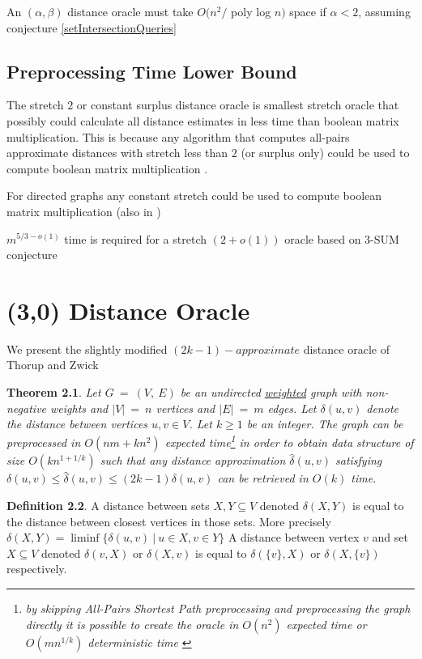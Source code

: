 \documentclass[shortabstract, lic, english]{iithesis}
\theoremstyle{definition} \newtheorem{definition}{Definition}[chapter]
\theoremstyle{remark} \newtheorem{remark}[definition]{Observation}
\theoremstyle{plain} \newtheorem{theorem}[definition]{Theorem}
\theoremstyle{plain} \newtheorem{lemma}[definition]{Lemma}
\theoremstyle{plain} \newtheorem{conjecture}[definition]{Conjecture}
\begin{document}
An $(\alpha, \beta)$ distance oracle must take $O(n^2/ $ poly log $n)$ space if $\alpha < 2$, assuming conjecture \ref{setIntersectionQueries}

\section{Preprocessing Time Lower Bound}
The stretch $2$ or constant surplus distance oracle is smallest stretch oracle that possibly could calculate all distance estimates in less time than boolean matrix multiplication.
This is because any algorithm that computes all-pairs approximate distances with stretch less than $2$ (or surplus only)
could be used to compute boolean matrix multiplication \cite{matrixLowerBound}.

For directed graphs any constant stretch could be used to compute boolean matrix multiplication (also in \cite{matrixLowerBound})

$m^{5/3 - o(1)}$ time is required for a stretch $(2 + o(1))$ oracle based on 3-SUM conjecture\cite{3sumLowerBound}




\chapter{(3,0) Distance Oracle} \label{30DistanceOracle}
We present the slightly modified $(2k-1)-approximate$ distance oracle of Thorup and Zwick\cite{a0OraclesBasic}

\begin{theorem}
Let $G~=~(V,~E)$ be an undirected \underline{weighted} graph with non-negative weights and $|V|~=~n$ vertices and $|E|~=~m$ edges.
Let $\delta(u,v)$ denote the distance between vertices $u,v \in V$.
Let $k\geq1$ be an integer. The graph can be preprocessed in $O(nm + kn^2)$ expected time\footnote{
    by skipping All-Pairs Shortest Path preprocessing and preprocessing the graph directly it is possible to create the oracle in $O(n^2)$ expected time \cite{a0OraclesN2Time} or $O(mn^{1/k})$ deterministic time \cite{a0OraclesMN1KDeterministicTime}}
in order to obtain data structure of size $O(kn^{1+1/k})$ such that any distance approximation
$\hat{\delta}(u,v)$ satisfying $\delta(u,v)\leq \hat{\delta}(u,v)\leq (2k-1)\delta(u, v)$
can be retrieved in $O(k)$ time.
\end{theorem}

\begin{definition}
    A distance between sets $X, Y \subseteq V$ denoted $\delta(X,Y)$ is equal to the distance
    between closest vertices in those sets. 
    \newline
    More precisely 
    $\delta(X,Y) = \liminf\{\delta(u,v) ~|~ u\in X, v\in Y\}$ \newline
    A distance between vertex $v$ and set $X \subseteq V$ denoted $\delta(v,X)$ or $\delta(X,v)$
    is equal to $\delta(\{v\},X)$ or $\delta(X,\{v\})$ respectively.
\end{definition}
\end{document}
